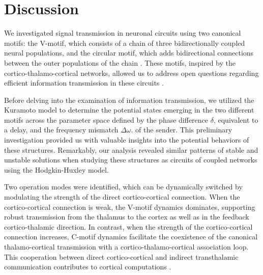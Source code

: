 \documentclass[../main.tex]{subfiles}
\begin{document}
\section{Discussion}


We investigated signal transmission in neuronal circuits using two canonical motifs: the V-motif, which consists of a chain of three bidirectionally coupled neural populations, and the circular motif, which adds bidirectional connections between the outer populations of the chain \citep{pariz_transmission_2021}.
These motifs, inspired by the cortico-thalamo-cortical networks, allowed us to address open questions regarding efficient information transmission in these circuits 
\citep{pariz_transmission_2021}. 

Before delving into the examination of information transmission, we utilized the Kuramoto model to determine the potential states emerging in the two different motifs across the parameter space defined by the phase difference $\delta$, equivalent to a delay, and the frequency mismatch $\Delta\omega$. of the sender.
This preliminary investigation provided us with valuable insights into the potential behaviors of these structures.
Remarkably, our analysis revealed similar patterns of stable and unstable solutions when studying these structures as circuits of coupled networks using the Hodgkin-Huxley model.

Two operation modes were identified, which can be dynamically switched by modulating the strength of the direct cortico-cortical connection.
When the cortico-cortical connection is weak, the V-motif dynamics dominates, supporting robust transmission from the thalamus to the cortex as well as in the feedback cortico-thalamic direction.
In contrast, when the strength of the cortico-cortical connection increases, C-motif dynamics facilitate the coexistence of the canonical thalamo-cortical transmission with a cortico-thalamo-cortical association loop.
This cooperation between direct cortico-cortical and indirect transthalamic communication contributes to cortical computations \citep{pariz_transmission_2021}.
\end{document}
